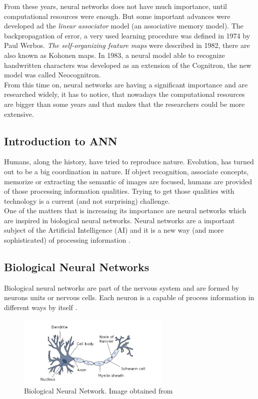From these years, neural networks does not have much importance, until computational resources were enough. But some important advances were developed ad the \textit{linear associator} model (an associative memory model). The backpropagation of error, a very used learning procedure was defined in 1974 by Paul Werbos. \textit{The self-organizing feature maps} were described in 1982, there are also known as Kohonen maps. In 1983, a neural model able to recognize handwritten characters was developed as an extension of the Cognitron, the new model was called Neocognitron.\\

From this time on, neural networks are having a significant importance and are researched widely, it has to notice, that nowadays the computational resources are bigger than some years and that makes that the researchers could be more extensive.\\

\subsection{Introduction to ANN}
Humans, along the history, have tried to reproduce nature. Evolution, has turned out to be a big coordination in nature. If object recognition, associate concepts, memorize or extracting the semantic of images are focused, humans are provided of those processing information qualities. Trying to get those qualities with technology is a current (and not surprising) challenge.\\

One of the matters that is increasing its importance are neural networks which are inspired in biological neural networks. Neural networks are a important subject of the Artificial Intelligence (AI) and it is a new way (and more sophisticated) of processing information \cite{Rojas}.\\

\subsection{Biological Neural Networks}
Biological neural networks are part of the nervous system and are formed by neurons units or nervous cells. Each neuron is a capable of process information in different ways by itself \cite{Rojas}.\\

\begin{figure}[htb]
\centering
\includegraphics[width=0.65\textwidth]{images_miscelaneus/neuron.png}
\caption{Biological Neural Network. Image obtained from \cite{BINN}} \label{fig:Bio-Neuron}
\end{figure}


